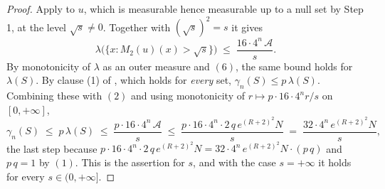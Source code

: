 \begin{proof}
Apply  to $u$, which is measurable hence measurable
up to a null set by Step 1, at the level $\sqrt s \neq 0$.  Together with
$(\sqrt s)^2 = s$ it gives
\[
  \lambda\bigl(\bigl\{x : M_2(u)(x) > \sqrt s\bigr\}\bigr)
    \;\leq\; \frac{16\cdot4^n\,\mathcal{A}}{s} .
\]
By monotonicity of $\lambda$ as an outer measure and $(6)$, the same bound
holds for $\lambda(S)$.  By clause (1) of
, which holds for \emph{every} set,
$\gamma_n(S) \leq p\,\lambda(S)$.  Combining these with $(2)$ and using
monotonicity of $r \mapsto p\cdot 16\cdot 4^n r/s$ on $[0,+\infty]$,
\[
  \gamma_n(S)
    \;\leq\; p\,\lambda(S)
    \;\leq\; \frac{p\cdot16\cdot4^n\,\mathcal{A}}{s}
    \;\leq\; \frac{p\cdot16\cdot4^n\cdot2\,q\,e^{(R+2)^2}N}{s}
    \;=\; \frac{32\cdot4^n\,e^{(R+2)^2}N}{s} ,
\]
the last step because
$p\cdot16\cdot4^n\cdot2\,q\,e^{(R+2)^2}N
 = 32\cdot4^n\,e^{(R+2)^2}N\cdot(p\,q)$ and $p\,q = 1$ by $(1)$.  This is the
assertion for $s$, and with the case $s = +\infty$ it holds for every
$s \in (0,+\infty]$.
\end{proof}
